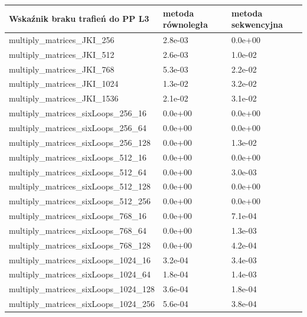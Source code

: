 \documentclass{scrartcl}
\begin{document}
\begin{table}[H]
\begin{tabular}{|l|l|l|}
\hline
Wskaźnik braku trafień do PP L3 & metoda równoległa & metoda sekwencyjna \\ \hline
multiply\_matrices\_JKI\_256    & 2.8e-03           & 0.0e+00            \\ \hline
multiply\_matrices\_JKI\_512    & 2.6e-03           & 1.0e-02            \\ \hline
multiply\_matrices\_JKI\_768    & 5.3e-03           & 2.2e-02            \\ \hline
multiply\_matrices\_JKI\_1024   & 1.3e-02           & 3.2e-02            \\ \hline
multiply\_matrices\_JKI\_1536   & 2.1e-02           & 3.1e-02            \\ 
\hline
multiply\_matrices\_sixLoops\_256\_16   & 0.0e+00           & 0.0e+00            \\ \hline
multiply\_matrices\_sixLoops\_256\_64   & 0.0e+00           & 0.0e+00            \\ \hline
multiply\_matrices\_sixLoops\_256\_128  & 0.0e+00           & 1.3e-02            \\ \hline
multiply\_matrices\_sixLoops\_512\_16   & 0.0e+00           & 0.0e+00            \\ \hline
multiply\_matrices\_sixLoops\_512\_64   & 0.0e+00           & 3.0e-03            \\ \hline
multiply\_matrices\_sixLoops\_512\_128  & 0.0e+00           & 0.0e+00            \\ \hline
multiply\_matrices\_sixLoops\_512\_256  & 0.0e+00           & 0.0e+00            \\ \hline
multiply\_matrices\_sixLoops\_768\_16   & 0.0e+00           & 7.1e-04            \\ \hline
multiply\_matrices\_sixLoops\_768\_64   & 0.0e+00           & 1.3e-03            \\ \hline
multiply\_matrices\_sixLoops\_768\_128  & 0.0e+00           & 4.2e-04            \\ \hline
multiply\_matrices\_sixLoops\_1024\_16  & 3.2e-04           & 3.4e-03            \\ \hline
multiply\_matrices\_sixLoops\_1024\_64  & 1.8e-04           & 1.4e-03            \\ \hline
multiply\_matrices\_sixLoops\_1024\_128 & 3.6e-04           & 1.8e-04            \\ \hline
multiply\_matrices\_sixLoops\_1024\_256 & 5.6e-04           & 3.8e-04            \\ \hline

\end{tabular}
\end{table}
\end{document}

